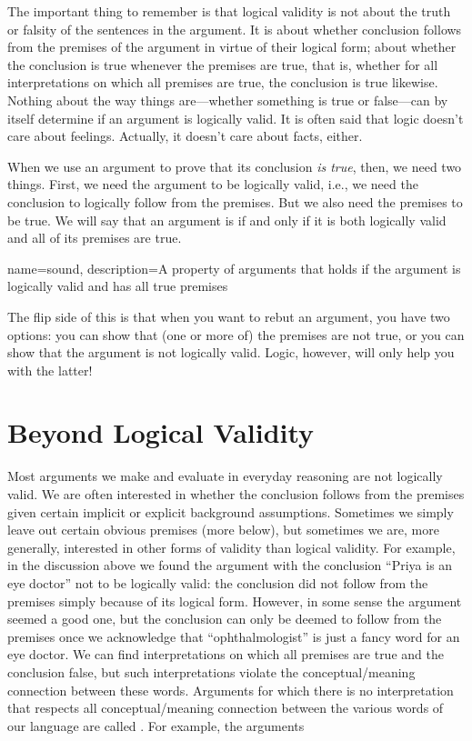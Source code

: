 The important thing to remember is that logical validity is not about the truth or falsity of the sentences in the argument. It is about whether conclusion follows from the premises of the argument in virtue of their logical form; about whether the conclusion is true whenever the premises are true, that is, whether for all interpretations on which all premises are true, the conclusion is true likewise. Nothing about the way things are---whether something is true or false---can by itself determine if an argument is logically valid. It is often said that logic doesn't care about feelings. Actually, it doesn't care about facts, either.

When we use an argument to prove that its conclusion \emph{is true}, then, we need two things. First, we need the argument to be logically valid, i.e., we need the conclusion to logically follow from the premises. But we also need the premises to be true. We will say that an argument is  if and only if it is both logically valid and all of its premises are true.

{
name=sound,
description={A property of arguments that holds if the argument is logically valid and has all true premises}
}

The flip side of this is that when you want to rebut an argument, you have two options: you can show that (one or more of) the premises are not true, or you can show that the argument is not logically valid.  Logic, however, will only help you with the latter!



\section{Beyond Logical Validity}
Most arguments we make and evaluate in everyday reasoning are not logically valid. We are often interested in whether the conclusion follows from the premises given certain implicit or explicit background assumptions. Sometimes we simply leave out certain obvious premises (more below), but sometimes we are, more generally, interested in other forms of validity than logical validity. For example, in the discussion above we found the argument with the conclusion ``Priya is an eye doctor'' not to be logically valid: the conclusion did not follow from the premises simply because of its logical form. However, in some sense the argument seemed a good one, but the conclusion can only be deemed to follow from the premises once we acknowledge that ``ophthalmologist'' is just a fancy word for an eye doctor. We can find interpretations on which all premises are true and the conclusion false, but such interpretations violate the conceptual/meaning connection between these words. Arguments for which there is no interpretation that respects all conceptual/meaning connection between the various words of our language are called . For example, the arguments

